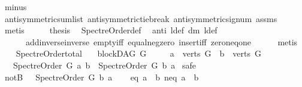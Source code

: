 \begin{isabellebody}
\ minus\ \isanewline
\ \ \ \ \isamarkupfalse%
\ antisymmetric{\isacharunderscore}{\kern0pt}sumlist\ antisymmetric{\isacharunderscore}{\kern0pt}tie{\isacharunderscore}{\kern0pt}break\ antisymmetric{\isacharunderscore}{\kern0pt}signum\ assms{\isacharparenleft}{\kern0pt}{}{\isacharparenright}{\kern0pt}\ \isamarkupfalse%
\ metis\isanewline
\ \ \isamarkupfalse%
\ \isamarkupfalse%
\ {\isachardoublequoteopen}{\isacharquery}{\kern0pt}thesis{\isachardoublequoteclose}\ \isamarkupfalse%
\ Spectre{\isacharunderscore}{\kern0pt}Order{\isacharunderscore}{\kern0pt}def\ \isamarkupfalse%
\ anti\ l{\isacharunderscore}{\kern0pt}def\ dm\ l{}{\isacharunderscore}{\kern0pt}def\ \isanewline
\ \ \ \ \ \ add{\isachardot}{\kern0pt}inverse{\isacharunderscore}{\kern0pt}inverse\ empty{\isacharunderscore}{\kern0pt}iff\ equal{\isacharunderscore}{\kern0pt}neg{\isacharunderscore}{\kern0pt}zero\ insert{\isacharunderscore}{\kern0pt}iff\ zero{\isacharunderscore}{\kern0pt}neq{\isacharunderscore}{\kern0pt}one\isanewline
\ \ \ \ \isamarkupfalse%
\ {\isacharparenleft}{\kern0pt}metis{\isacharparenright}{\kern0pt}\isanewline
{}\isamarkupfalse%
%
\endisatagproof
{\isafoldproof}%
%
\isadelimproof
\ \ \isanewline
%
\endisadelimproof
\isanewline
{}\isamarkupfalse%
\ Spectre{\isacharunderscore}{\kern0pt}Order{\isacharunderscore}{\kern0pt}total{\isacharcolon}{\kern0pt}\isanewline
\ \ \ {\isachardoublequoteopen}blockDAG\ G{\isachardoublequoteclose}\isanewline
\ \ \ \ \ {\isachardoublequoteopen}a\ {\isasymin}\ verts\ G\ {\isasymand}\ b\ {\isasymin}\ verts\ G{\isachardoublequoteclose}\ \isanewline
\ \ \ {\isachardoublequoteopen}Spectre{\isacharunderscore}{\kern0pt}Order\ G\ a\ b\ {\isasymor}\ Spectre{\isacharunderscore}{\kern0pt}Order\ G\ b\ a{\isachardoublequoteclose}\isanewline
%
\isadelimproof
%
\endisadelimproof
%
\isatagproof
{}\isamarkupfalse%
\ safe\isanewline
\ \ \isamarkupfalse%
\ notB{\isacharcolon}{\kern0pt}\ {\isachardoublequoteopen}\ {\isasymnot}\ Spectre{\isacharunderscore}{\kern0pt}Order\ G\ b\ a{\isachardoublequoteclose}\isanewline
\ \ \isamarkupfalse%
\ {\isacharparenleft}{\kern0pt}eq{\isacharparenright}{\kern0pt}\ {\isachardoublequoteopen}a\ {\isacharequal}{\kern0pt}\ b{\isachardoublequoteclose}{\isacharbar}{\kern0pt}\ {\isacharparenleft}{\kern0pt}neq{\isacharparenright}{\kern0pt}\ {\isachardoublequoteopen}a\ {\isasymnoteq}\ b{\isachardoublequoteclose}\ \isamarkupfalse%

\end{isabellebody}
